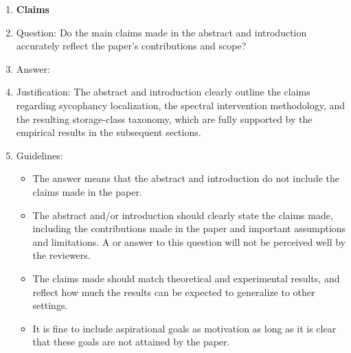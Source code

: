 \documentclass{article}
\begin{document}
\begin{enumerate}

\item {\bf Claims}
    \item[] Question: Do the main claims made in the abstract and introduction accurately reflect the paper's contributions and scope?
    \item[] Answer: \answerYes{}
    \item[] Justification: The abstract and introduction clearly outline the claims regarding sycophancy localization, the spectral intervention methodology, and the resulting storage-class taxonomy, which are fully supported by the empirical results in the subsequent sections.
    \item[] Guidelines:
    \begin{itemize}
        \item The answer \answerNA{} means that the abstract and introduction do not include the claims made in the paper.
        \item The abstract and/or introduction should clearly state the claims made, including the contributions made in the paper and important assumptions and limitations. A \answerNo{} or \answerNA{} answer to this question will not be perceived well by the reviewers. 
        \item The claims made should match theoretical and experimental results, and reflect how much the results can be expected to generalize to other settings. 
        \item It is fine to include aspirational goals as motivation as long as it is clear that these goals are not attained by the paper. 
    \end{itemize}


\end{enumerate}
\end{document}
